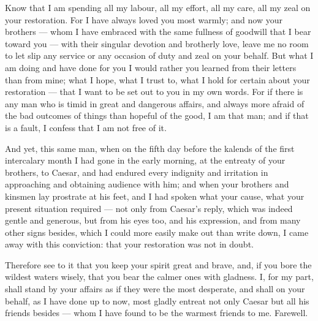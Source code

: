 

 Know that I am spending all my labour, all my effort, all my care, all my zeal on your restoration. For I have always loved you most warmly; and now your brothers --- whom I have embraced with the same fullness of goodwill that I bear toward you --- with their singular devotion and brotherly love, leave me no room to let slip any service or any occasion of duty and zeal on your behalf. But what I am doing and have done for you I would rather you learned from their letters than from mine; what I hope, what I trust to, what I hold for certain about your restoration --- that I want to be set out to you in my own words. For if there is any man who is timid in great and dangerous affairs, and always more afraid of the bad outcomes of things than hopeful of the good, I am that man; and if that is a fault, I confess that I am not free of it.

 And yet, this same man, when on the fifth day before the kalends of the first intercalary month I had gone in the early morning, at the entreaty of your brothers, to Caesar, and had endured every indignity and irritation in approaching and obtaining audience with him; and when your brothers and kinsmen lay prostrate at his feet, and I had spoken what your cause, what your present situation required --- not only from Caesar's reply, which was indeed gentle and generous, but from his eyes too, and his expression, and from many other signs besides, which I could more easily make out than write down, I came away with this conviction: that your restoration was not in doubt.

 Therefore see to it that you keep your spirit great and brave, and, if you bore the wildest waters wisely, that you bear the calmer ones with gladness. I, for my part, shall stand by your affairs as if they were the most desperate, and shall on your behalf, as I have done up to now, most gladly entreat not only Caesar but all his friends besides --- whom I have found to be the warmest friends to me. Farewell.

